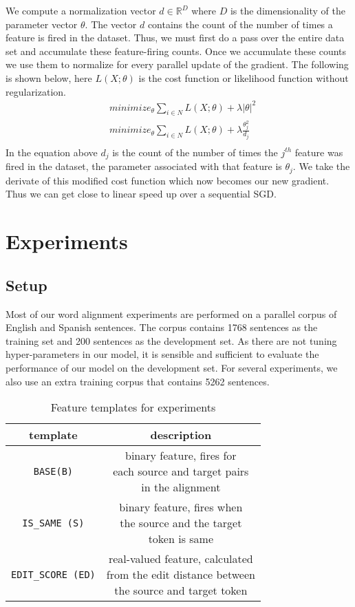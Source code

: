 \documentclass[11pt,letterpaper]{article}
\begin{document}
We compute a normalization vector $d \in \mathbb{R}^D$ where $D$ is the dimensionality of the parameter vector $\theta$. The vector $d$ contains the count of the number of times a feature is fired in the dataset. Thus, we must first do a pass over the entire data set and accumulate these feature-firing counts. Once we accumulate these counts we use them to normalize for every parallel update of the gradient. 
The following is shown below, %
here $L(X;\theta)$ is the cost function or likelihood function without regularization.
\begin{align*}
& minimize_\theta \sum_{i \in N} L(X;\theta) + \lambda|\theta|^2\\
& minimize_\theta \sum_{i \in N} L(X;\theta) + \lambda \frac{\theta_j^2}{d_j}\\
\end{align*}
In the equation above $d_j$ is the count of the number of times the $j^{th}$ feature was fired in the dataset, the parameter associated with that feature is $\theta_j$. We take the derivate of this modified cost function which now becomes our new gradient. Thus we can get close to linear speed up over a sequential SGD.

\section{Experiments}
\subsection{Setup}
Most of our word alignment experiments are performed on a parallel corpus of English and Spanish sentences.
The corpus contains 1768 sentences as the training set and 200 sentences as the development set.
As there are not tuning hyper-parameters in our model, it is sensible and sufficient to evaluate the performance of our model on the development set.
For several experiments, we also use an extra training corpus that contains 5262 sentences.

\begin{table}[h]
\begin{center}
\begin{tabular}{|c|c|}
\hline 
\bf template & \bf description \\
\hline
\texttt{BASE(B)} & \makecell[l]{binary feature, fires for\\ each source and target pairs\\ in the alignment} \\
\texttt{IS\_SAME (S)} & \makecell[l]{binary feature, fires when\\ the source and the target\\ token is same}\\
\texttt{EDIT\_SCORE (ED)} & \makecell[l]{real-valued feature, calculated\\ from the edit distance between\\ the source and target token}\\
\hline
\end{tabular}
\end{center}
\caption{\label{tab:featureset} Feature templates for experiments}
\end{table}
\end{document}
